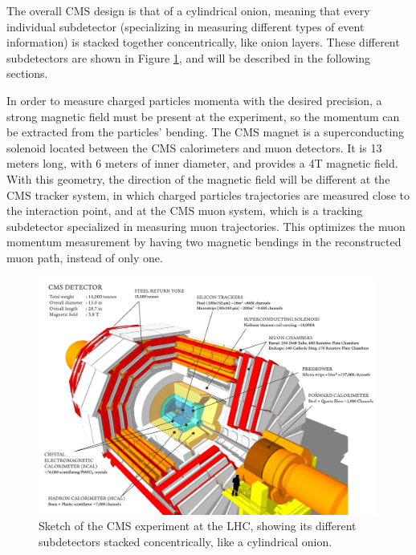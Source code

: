The overall CMS design is that of a cylindrical onion, meaning that every individual subdetector (specializing in measuring different types of event information) is stacked together concentrically, like onion layers. 
These different subdetectors are shown in Figure \ref{fig:cms_sketch}, and will be described in the following sections. 

In order to measure charged particles momenta with the desired precision, a strong magnetic field must be present at the experiment, so the momentum can be extracted from the particles' bending. 
The CMS magnet is a superconducting solenoid located between the CMS calorimeters and muon detectors. 
It is 13 meters long, with 6 meters of inner diameter, and provides a 4T magnetic field. 
With this geometry, the direction of the magnetic field will be different at the CMS tracker system, in which charged particles trajectories are measured close to the interaction point, and at the CMS muon system, which is a tracking subdetector specialized in measuring muon trajectories. 
This optimizes the muon momentum measurement by having two magnetic bendings in the reconstructed muon path, instead of only one. 

\begin{figure}[h]
\centering 
\includegraphics[width=0.99\textwidth]{figures/cms_sketch}\hfil
\caption{Sketch of the CMS experiment at the LHC, showing its different subdetectors stacked concentrically, like a cylindrical onion. }
\label{fig:cms_sketch}
\end{figure}

